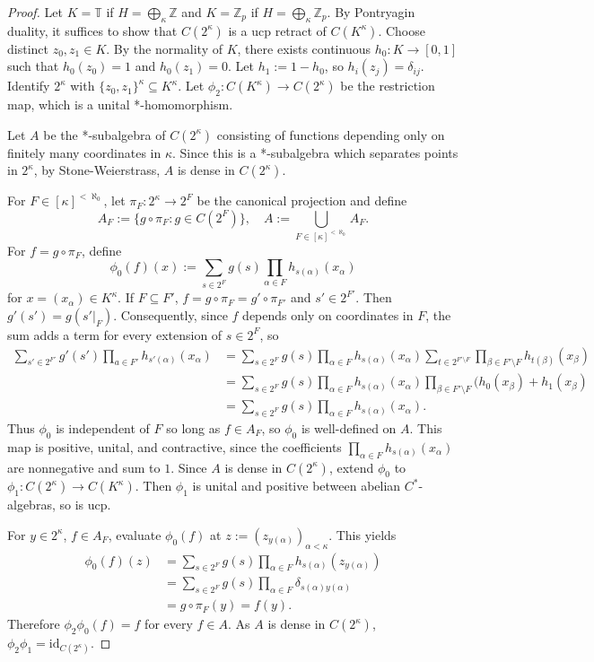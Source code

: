 \documentclass[10pt,a4paper]{amsart}
\begin{document}
\begin{proof}
    Let $K=\mathbb{T}$ if $H=\bigoplus_\kappa\mathbb{Z}$ and $K=\mathbb{Z}_p$ if $H=\bigoplus_{\kappa}\mathbb{Z}_p$. By Pontryagin duality, it suffices to show that $C(2^\kappa)$ is a ucp retract of $C(K^\kappa)$. Choose distinct $z_0,z_1\in K$. By the normality of $K$, there exists continuous $h_0:K\rightarrow[0,1]$ such that $h_0(z_0)=1$ and $h_0(z_1)=0$. Let $h_1:=1-h_0$, so $h_i(z_j)=\delta_{ij}$. Identify $2^\kappa$ with $\{z_0,z_1\}^\kappa\subseteq K^\kappa$. Let $\phi_2:C(K^\kappa)\rightarrow C(2^\kappa)$ be the restriction map, which is a unital *-homomorphism.

    Let $A$ be the *-subalgebra of $C(2^\kappa)$ consisting of functions depending only on finitely many coordinates in $\kappa$. Since this is a *-subalgebra which separates points in $2^\kappa$, by Stone-Weierstrass, $A$ is dense in $C(2^\kappa)$. 
    
    
    For $F\in[\kappa]^{<\aleph_0}$, let $\pi_F:2^\kappa\rightarrow 2^F$ be the canonical projection and define
    \[A_F:=\{g\circ\pi_F:g\in C(2^F)\},\quad A:=\bigcup_{F\in [\kappa]^{<\aleph_0}}A_F.\]
    For $f=g\circ\pi_F$, define 
    \[\phi_0(f)(x):=\sum_{s\in 2^F}g(s)\prod_{\alpha\in F}h_{s(\alpha)}(x_\alpha)\]
    for $x=(x_\alpha)\in K^\kappa$. If $F\subseteq F'$, $f=g\circ \pi_F=g'\circ\pi_{F'}$ and $s'\in 2^{F'}$. Then $g'(s')=g(s'|_F)$. Consequently, since $f$ depends only on coordinates in $F$, the sum adds a term for every extension of $s\in 2^F$, so
    \begin{align*}
        \sum_{s'\in 2^{F'}}g'(s')\prod_{a\in F'}h_{s'(\alpha)}(x_\alpha) &= \sum_{s\in 2^F}g(s)\prod_{\alpha\in F}h_{s(\alpha)}(x_\alpha) \sum_{t\in 2^{F'\setminus F}}\prod_{\beta\in F'\setminus F}h_{t(\beta)}(x_\beta) \\
        &= \sum_{s\in 2^F}g(s)\prod_{\alpha\in F}h_{s(\alpha)}(x_\alpha)\prod_{\beta\in F'\setminus F}(h_0(x_\beta)+h_1(x_\beta) \\
        &= \sum_{s\in 2^F}g(s)\prod_{\alpha\in F}h_{s(\alpha)}(x_\alpha).
    \end{align*}
    Thus $\phi_0$ is independent of $F$ so long as $f\in A_F$, so $\phi_0$ is well-defined on $A$. This map is positive, unital, and contractive, since the coefficients $\prod_{\alpha\in F}h_{s(\alpha)}(x_\alpha)$ are nonnegative and sum to $1$. Since $A$ is dense in $C(2^\kappa)$, extend $\phi_0$ to $\phi_1:C(2^\kappa)\rightarrow C(K^\kappa)$. Then $\phi_1$ is unital and positive between abelian $C^*$-algebras, so is ucp.

    For $y\in 2^\kappa$, $f\in A_F$, evaluate $\phi_0(f)$ at $z:=(z_{y(\alpha)})_{\alpha<\kappa}$. This yields
    \begin{align*}
        \phi_0(f)(z) &= \sum_{s\in 2^F}g(s)\prod_{\alpha\in F} h_{s(\alpha)}(z_{y(\alpha)}) \\
        &= \sum_{s\in 2^F}g(s)\prod_{\alpha\in F}\delta_{s(\alpha)y(\alpha)} \\
        &= g\circ\pi_F(y)=f(y).
    \end{align*}
    Therefore $\phi_2\phi_0(f)=f$ for every $f\in A$.
    As $A$ is dense in $C(2^\kappa)$, $\phi_2\phi_1=\mathrm{id}_{C(2^\kappa)}$.
\end{proof}
\end{document}
